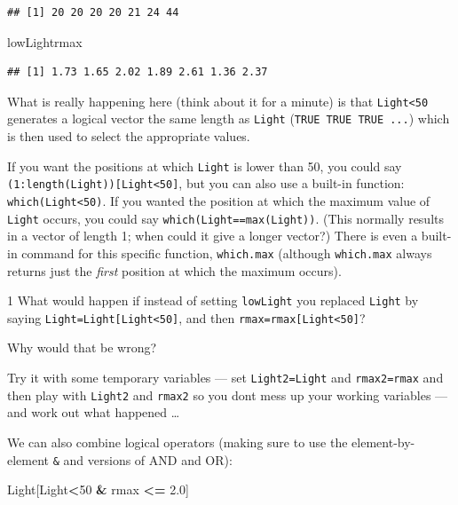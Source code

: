 \documentclass[11pt,]{article}
\newenvironment{Shaded}{\begin{snugshade}}{\end{snugshade}}
\newcommand{\DecValTok}[1]{\textcolor[rgb]{0.00,0.00,0.81}{#1}}
\newcommand{\FloatTok}[1]{\textcolor[rgb]{0.00,0.00,0.81}{#1}}
\newcommand{\NormalTok}[1]{#1}
\newcommand{\OperatorTok}[1]{\textcolor[rgb]{0.81,0.36,0.00}{\textbf{#1}}}
\newcommand{\StringTok}[1]{\textcolor[rgb]{0.31,0.60,0.02}{#1}}
\let\BeginKnitrBlock\begin \let\EndKnitrBlock\end
\begin{document}
\begin{verbatim}
## [1] 20 20 20 20 21 24 44
\end{verbatim}

\begin{Shaded}
\begin{Highlighting}[]
\NormalTok{lowLightrmax}
\end{Highlighting}
\end{Shaded}

\begin{verbatim}
## [1] 1.73 1.65 2.02 1.89 2.61 1.36 2.37
\end{verbatim}

What is really happening here (think about it for a minute) is that \texttt{Light\textless{}50} generates a logical vector the same length as \texttt{Light} (\texttt{TRUE\ TRUE\ TRUE\ ...}) which is then used to select the appropriate
values.

If you want the positions at which \texttt{Light} is lower than 50, you could say
\texttt{(1:length(Light)){[}Light\textless{}50{]}}, but you can also use a built-in function: \texttt{which(Light\textless{}50)}. If you wanted the position at which the maximum value
of \texttt{Light} occurs, you could say \texttt{which(Light==max(Light))}. (This normally results in a vector of length 1; when could it give a longer vector?) There is even a built-in command for this specific function, \texttt{which.max} (although \texttt{which.max} always returns just the \emph{first} position at which the maximum occurs).

\BeginKnitrBlock{exercisebox}{1}
What would happen if instead of setting \texttt{lowLight} you replaced \texttt{Light} by saying \texttt{Light=Light{[}Light\textless{}50{]}}, and then \texttt{rmax=rmax{[}Light\textless{}50{]}}?

Why would that be wrong?

Try it with some temporary variables --- set \texttt{Light2=Light} and \texttt{rmax2=rmax} and then play with \texttt{Light2} and \texttt{rmax2} so you dont mess up your working variables --- and work out what happened \ldots{}
\EndKnitrBlock{exercisebox}

We can also combine logical operators (making sure to use the element-by-element \texttt{\&} and \texttt{\textbar{}} versions of AND and OR):

\begin{Shaded}
\begin{Highlighting}[]
\NormalTok{Light[Light}\OperatorTok{<}\DecValTok{50} \OperatorTok{&}\StringTok{ }\NormalTok{rmax }\OperatorTok{<=}\StringTok{ }\FloatTok{2.0}\NormalTok{]}
\end{Highlighting}
\end{Shaded}
\end{document}
